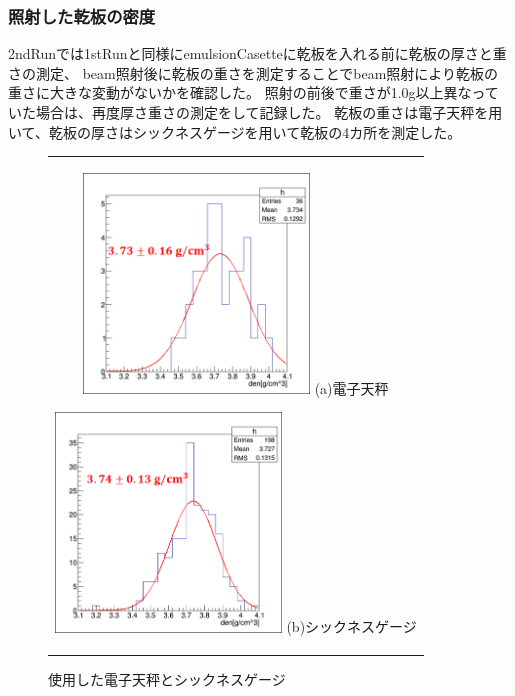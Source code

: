 \documentclass[12pt,a4paper]{jarticle}
\begin{document}
\subsubsection{照射した乾板の密度}
2ndRunでは1stRunと同様にemulsionCasetteに乾板を入れる前に乾板の厚さと重さの測定、
beam照射後に乾板の重さを測定することでbeam照射により乾板の重さに大きな変動がないかを確認した。
照射の前後で重さが1.0g以上異なっていた場合は、再度厚さ重さの測定をして記録した。
乾板の重さは電子天秤を用いて、乾板の厚さはシックネスゲージを用いて乾板の4カ所を測定した。
\begin{figure}[htbp]
  \centering
      \begin{tabular}{c}
        \begin{minipage}{0.5\hsize}
          \centering
            \includegraphics[clip, width=60mm]{1stRun_thin_den.png}
            \hspace{1.6cm} (a)電子天秤
        \end{minipage}
        
        \begin{minipage}{0.5\hsize}
          \centering
            \includegraphics[clip, width=60mm]{2ndRun_thin_den.png}
            \hspace{1.6cm} (b)シックネスゲージ
        \end{minipage}
    
      \end{tabular}
      \caption{使用した電子天秤とシックネスゲージ\label{fig:tennbinn_thicknessgage}}
\end{figure}
\end{document}
